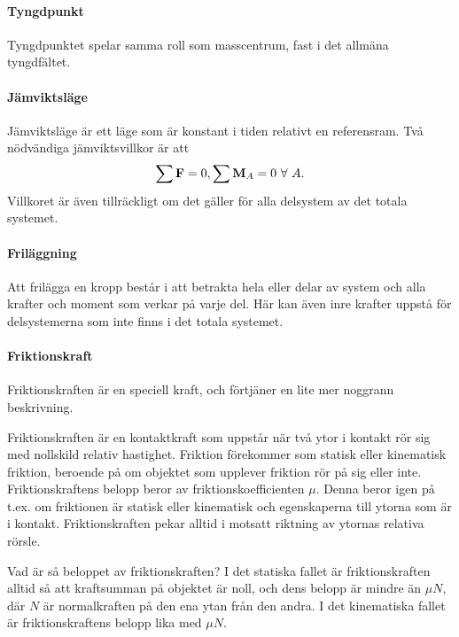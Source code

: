 \paragraph{Tyngdpunkt}
Tyngdpunktet spelar samma roll som masscentrum, fast i det allmäna tyngdfältet.

\paragraph{Jämviktsläge}
Jämviktsläge är ett läge som är konstant i tiden relativt en referensram. Två nödvändiga jämviktsvillkor är att
\begin{align*}
	\sum\vect{F} = 0, \sum\vect{M}_A = 0 \ \forall\ A.
\end{align*}
Villkoret är även tillräckligt om det gäller för alla delsystem av det totala systemet.

\paragraph{Friläggning}
Att frilägga en kropp består i att betrakta hela eller delar av system och alla krafter och moment som verkar på varje del. Här kan även inre krafter uppstå för delsystemerna som inte finns i det totala systemet.

\paragraph{Friktionskraft}
Friktionskraften är en speciell kraft, och förtjäner en lite mer noggrann beskrivning.

Friktionskraften är en kontaktkraft som uppstår när två ytor i kontakt rör sig med nollskild relativ hastighet. Friktion förekommer som statisk eller kinematisk friktion, beroende på om objektet som upplever friktion rör på sig eller inte. Friktionskraftens belopp beror av friktionskoefficienten $\mu$. Denna beror igen på t.ex. om friktionen är statisk eller kinematisk och egenskaperna till ytorna som är i kontakt. Friktionskraften pekar alltid i motsatt riktning av ytornas relativa rörsle.

Vad är så beloppet av friktionskraften? I det statiska fallet är friktionskraften alltid så att kraftsumman på objektet är noll, och dens belopp är mindre än $\mu N$, där $N$ är normalkraften på den ena ytan från den andra. I det kinematiska fallet är friktionskraftens belopp lika med $\mu N$.